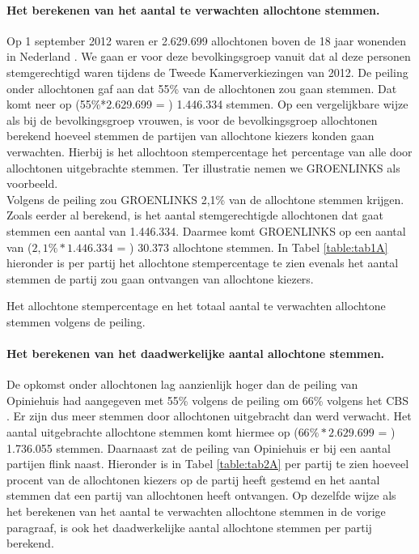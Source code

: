 \paragraph{Het berekenen van het aantal te verwachten allochtone stemmen.}
Op 1 september 2012 waren er 2.629.699 allochtonen boven de 18 jaar wonenden in Nederland \citep{CBS_allochtonen}. We gaan er voor deze bevolkingsgroep vanuit dat al deze personen stemgerechtigd waren tijdens de Tweede Kamerverkiezingen van 2012. De peiling onder allochtonen \citep{Opiniehuis} gaf aan dat 55\% van de allochtonen zou gaan stemmen. Dat komt neer op (55\%*2.629.699 = ) 1.446.334 stemmen. Op een vergelijkbare wijze als bij de bevolkingsgroep vrouwen, is voor de bevolkingsgroep allochtonen berekend hoeveel stemmen de partijen van allochtone kiezers konden gaan verwachten. Hierbij is het allochtoon stempercentage het percentage van alle door allochtonen uitgebrachte stemmen. Ter illustratie nemen we GROENLINKS als voorbeeld. \\
\indent Volgens de peiling zou GROENLINKS 2,1\% van de allochtone stemmen krijgen. Zoals eerder al berekend, is het aantal stemgerechtigde allochtonen dat gaat stemmen een aantal van 1.446.334. Daarmee komt GROENLINKS op een aantal van ($2,1\%*1.446.334$ = ) 30.373 allochtone stemmen. In Tabel \ref{table:tab1A} hieronder is per partij het allochtone stempercentage te zien evenals het aantal stemmen de partij zou gaan ontvangen van allochtone kiezers.  

\begin{table}[H]
\centering
	\begin{footnotesize}
		
	\end{footnotesize}
			\caption{Het allochtone stempercentage en het totaal aantal te verwachten allochtone stemmen volgens de peiling.}
\label{table:tab1A} 
\end{table}


\paragraph{Het berekenen van het daadwerkelijke aantal allochtone stemmen.}
De opkomst onder allochtonen lag aanzienlijk hoger dan de peiling van Opiniehuis \citeyearpar{Opiniehuis} had aangegeven met 55\% volgens de peiling om 66\% volgens het CBS \citeyearpar{CBS_stemgedrag}. Er zijn dus meer stemmen door allochtonen uitgebracht dan werd verwacht. Het aantal uitgebrachte allochtone stemmen komt hiermee op ($66\%*2.629.699$ = ) 1.736.055 stemmen. Daarnaast zat de peiling van Opiniehuis er bij een aantal partijen flink naast.  Hieronder is in Tabel \ref{table:tab2A} per partij te zien hoeveel procent van de allochtonen kiezers op de partij heeft gestemd en het aantal stemmen dat een partij van allochtonen heeft ontvangen. Op dezelfde wijze als het berekenen van het aantal te verwachten allochtone stemmen in de vorige paragraaf, is ook het daadwerkelijke aantal allochtone stemmen per partij berekend.
    
